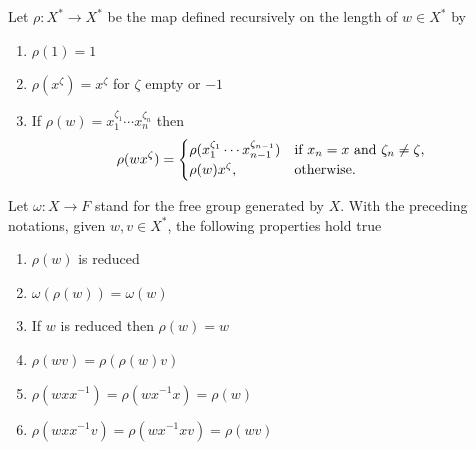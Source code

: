 \begin{ntn}
    Let\/ $\rho\colon X^*\to X^*$ be the map defined recursively on the length of\/ $w\in X^*$ by
    \begin{enumerate}[-]
        \item $\rho(1)=1$
        \item $\rho(x^\zeta)=x^\zeta$ for\/ $\zeta$ empty or\/ $-1$
        \item If\/ $\rho(w)=x_1^{\zeta_1}\cdots x_n^{\zeta_n}$ then
        $$
            \rho(wx^\zeta) = \begin{cases}
                 \rho(x_1^{\zeta_1}\cdots x_{n-1}^{\zeta_{n-1}})
                    &\text{\rm if $x_n=x$ and $\zeta_n\ne\zeta$},\\
                 \rho(w)x^\zeta,
                    &\text{\rm otherwise}.
            \end{cases}
        $$
    \end{enumerate}
\end{ntn}

\begin{lem}\label{lem:rho-properties}
    Let $\omega\colon X\to F$ stand for the free group generated by $X$. With the preceding notations, given $w,v\in X^*$, the following properties hold true
    \begin{enumerate}[\rm a)]
        \item $\rho(w)$ is reduced
        \item $\omega(\rho(w))=\omega(w)$
        \item If $w$ is reduced then $\rho(w)=w$
        \item $\rho(wv)=\rho(\rho(w)v)$
        \item $\rho(wxx^{-1})=\rho(wx^{-1}x)=\rho(w)$
        \item $\rho(wxx^{-1}v)=\rho(wx^{-1}xv)=\rho(wv)$
    \end{enumerate}
\end{lem}


